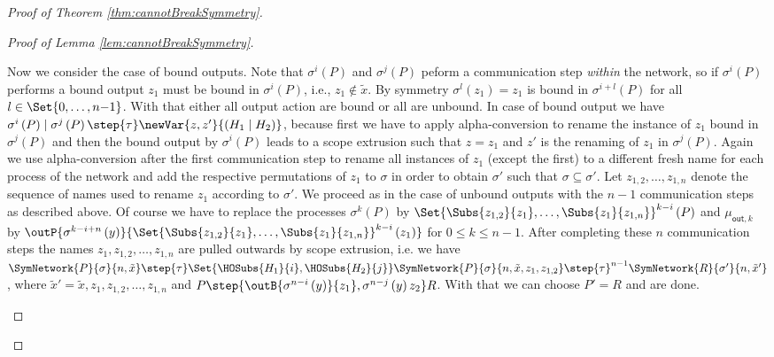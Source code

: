 \documentclass[11pt,techReport]{eptcs}
\begin{document}
\begin{proof}[Proof of Theorem \ref{thm:cannotBreakSymmetry}]
\begin{proof}[Proof of Lemma \ref{lem:cannotBreakSymmetry}]
\begin{description}
			Now we consider the case of bound outputs. Note that $ \sigma^i\left( P \right) $ and $ \sigma^j\left( P \right) $ peform a communication step \emph{within} the network, so if $ \sigma^i\left( P \right) $ performs a bound output $ z_1 $ must be bound in $ \sigma^i\left( P \right) $, i.e., $ z_1 \notin \tilde{x} $. By symmetry $ \sigma^l\left( z_1 \right) = z_1 $ is bound in $ \sigma^{i{+}l}\left( P \right) $ for all $ l \in \Set{ 0, \ldots, n{-}1 } $. With that either all output action are bound or all are unbound. In case of bound output we have $ \sigma^i\left( P \right) \mid \sigma^j\left( P \right) \step{\tau} \newVar{z, z'}{\left( H_1 \mid H_2 \right)} $, because first we have to apply alpha-conversion to rename the instance of $ z_1 $ bound in $ \sigma^j\left( P \right) $ and then the bound output by $ \sigma^i\left( P \right) $ leads to a scope extrusion such that $ z = z_1 $ and $ z' $ is the renaming of $ z_1 $ in $ \sigma^j\left( P \right) $. Again we  use alpha-conversion after the first communication step to rename all instances of $ z_1 $ (except the first) to a different fresh name for each process of the network and add the respective permutations of $ z_1 $ to $ \sigma $ in order to obtain $ \sigma' $ such that $ \sigma \subseteq \sigma' $. Let $ z_{1, 2}, \ldots, z_{1, n} $ denote the sequence of names used to rename $ z_1 $ according to $ \sigma' $. We proceed as in the case of unbound outputs with the $ n {-} 1 $ communication steps as described above. Of course we have to replace the processes $ \sigma^k\left( P \right) $ by $ \Set{ \Subs{z_{1, 2}}{z_1}, \ldots, \Subs{z_1}{z_{1, n}} }^{k{-}i}\left( P \right) $ and $ \mu_{\mathsf{out}, k} $ by $ \outP{\sigma^{k{-}i{+}n}\left( y \right)}{\Set{ \Subs{z_{1, 2}}{z_1}, \ldots, \Subs{z_1}{z_{1, n}} }^{k{-}i}\left( z_1 \right)} $ for $ 0 \leq k \leq n{-}1 $. After completing these $ n $ communication steps the names $ z_1, z_{1, 2}, \ldots, z_{1, n} $ are pulled outwards by scope extrusion, i.e. we have $ \SymNetwork{P}{\sigma}{n, \tilde{x}} \step{\tau} \Set{ \HOSubs{H_1}{i}, \HOSubs{H_2}{j} }\SymNetwork{P}{\sigma}{n, \tilde{x}, z_1, z_{1, 2}} \step{\tau}^{n{-}1} \SymNetwork{R}{\sigma'}{n, \tilde{x}'} $, where $ \tilde{x}' = \tilde{x}, z_1, z_{1, 2}, \ldots, z_{1, n} $ and $ P \step{\outB{\sigma^{n{-}i}\left( y \right)}{z_1}, \sigma^{n{-}j}\left( y \right)z_2} R $. With that we can choose $ P' = R $ and are done.
	\end{description}
\end{proof}


\end{proof}
\end{document}
